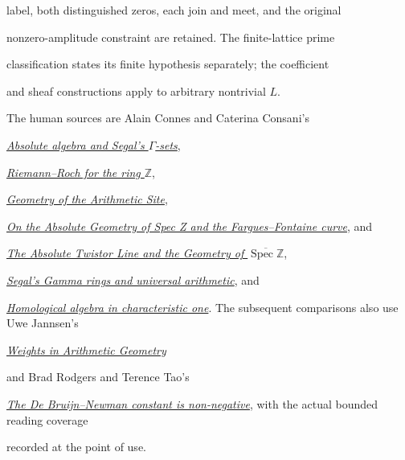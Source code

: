 \documentclass[11pt]{article}
\theoremstyle{definition}
\begin{document}
label, both distinguished zeros, each join and meet, and the original



nonzero-amplitude constraint are retained. The finite-lattice prime



classification states its finite hypothesis separately; the coefficient



and sheaf constructions apply to arbitrary nontrivial $L$.



The human sources are Alain Connes and Caterina Consani's



\href{https://arxiv.org/abs/1502.05585v2}{\emph{Absolute algebra and
Segal's $\Gamma$-sets}},



\href{https://arxiv.org/abs/2306.00456v1}{\emph{Riemann--Roch for the ring
$\mathbb Z$}},



\href{https://arxiv.org/abs/1502.05580v1}{\emph{Geometry of the Arithmetic Site}},



\href{https://arxiv.org/abs/2606.06604v1}{\emph{On the Absolute Geometry of
Spec Z and the Fargues--Fontaine curve}}, and



\href{https://arxiv.org/abs/2609.00299v1}{\emph{The Absolute Twistor Line and
the Geometry of $\overline{\operatorname{Spec}\mathbb Z}$}},



\href{https://arxiv.org/abs/2004.08879v1}{\emph{Segal's Gamma rings and
universal arithmetic}}, and



\href{https://arxiv.org/abs/1703.02325v1}{\emph{Homological algebra in
characteristic one}}. The subsequent comparisons also use Uwe Jannsen's



\href{https://arxiv.org/abs/1003.0927v1}{\emph{Weights in Arithmetic Geometry}}



and Brad Rodgers and Terence Tao's



\href{https://arxiv.org/abs/1801.05914v5}{\emph{The De Bruijn--Newman
constant is non-negative}}, with the actual bounded reading coverage



recorded at the point of use.
\end{document}
